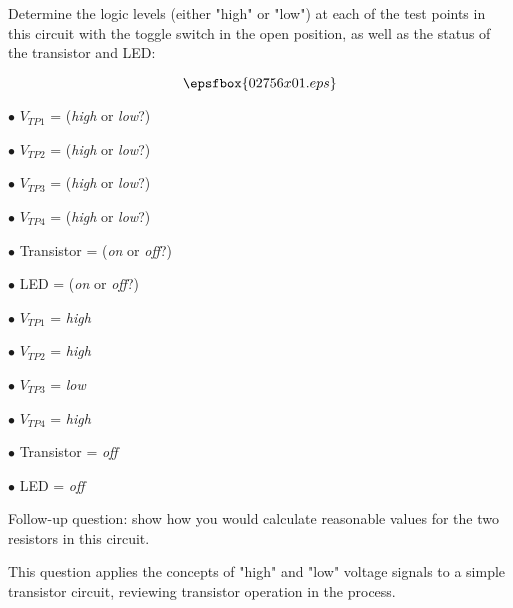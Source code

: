 

Determine the logic levels (either "high" or "low") at each of the test points in this circuit with the toggle switch in the open position, as well as the status of the transistor and LED:

$$\epsfbox{02756x01.eps}$$

\medskip
\item{$\bullet$} $V_{TP1}$ = ({\it high} or {\it low}?)
\item{$\bullet$} $V_{TP2}$ = ({\it high} or {\it low}?)
\item{$\bullet$} $V_{TP3}$ = ({\it high} or {\it low}?)
\item{$\bullet$} $V_{TP4}$ = ({\it high} or {\it low}?)
\item{$\bullet$} Transistor = ({\it on} or {\it off}?) 
\item{$\bullet$} LED = ({\it on} or {\it off}?) 
\medskip







\medskip
\item{$\bullet$} $V_{TP1}$ = {\it high}
\item{$\bullet$} $V_{TP2}$ = {\it high}
\item{$\bullet$} $V_{TP3}$ = {\it low}
\item{$\bullet$} $V_{TP4}$ = {\it high}
\item{$\bullet$} Transistor = {\it off} 
\item{$\bullet$} LED = {\it off}
\medskip

\vskip 10pt

Follow-up question: show how you would calculate reasonable values for the two resistors in this circuit.







This question applies the concepts of "high" and "low" voltage signals to a simple transistor circuit, reviewing transistor operation in the process.




